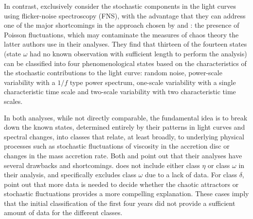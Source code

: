 \documentclass[fleqn,usenatbib]{mnras}
\begin{document}
In contrast, \citet{polyakov2012} exclusively consider the stochastic components in the light curves using 
flicker-noise spectroscopy (FNS), with the advantage that they can address one of the major shortcomings in the approach chosen by \citet{misra2004,misra2006} and 
\citet{harikrishnan2011}: the presence of Poisson fluctuations, which may contaminate the measures of chaos theory the latter authors use in their analyses.
They find that thirteen of the fourteen states (state $\omega$ had no known observation with sufficient length to perform the analysis) can be classified into 
four phenomenological states based on the characteristics of the stochastic contributions to the light curve: random noise, power-scale variability with a $1/f$ type 
power spectrum, one-scale variability with a single characteristic time scale and two-scale variability with two characteristic time scales. 

In both analyses, while not directly comparable, the fundamental idea is to break down the known states, determined entirely by their patterns in light curves and 
spectral changes, into classes that relate, at least broadly, to underlying physical processes such as stochastic fluctuations of viscosity in the accretion disc or 
changes in the mass accretion rate. Both \citet{harikrishnan2011} and \citet{polyakov2012} point out that their analyses have several drawbacks and shortcomings. 
\citet{harikrishnan2011} does not include either class $\eta$ or class $\omega$ in their analysis, and \citet{polyakov2012} specifically excludes class $\omega$ due to 
a lack of data. For class $\delta$, \citet{polyakov2012} point out that more data is needed to decide whether the chaotic attractors or stochastic fluctuations 
provides a more compelling explanation. These cases imply that the initial classification of the first four years did not provide a sufficient amount of data for the 
different classes.
\end{document}
